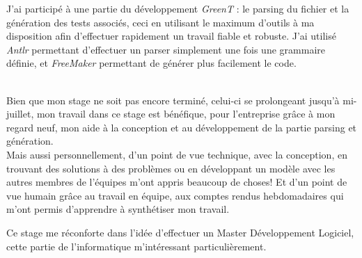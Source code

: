 \documentclass[a4paper, 12pt]{article}
\begin{document}
	J'ai participé à une partie du développement \textit{GreenT} : le parsing du fichier et la génération des tests associés, ceci en utilisant le maximum d'outils à ma
	disposition afin d'effectuer rapidement un travail fiable et robuste. J'ai utilisé \textit{Antlr} permettant d'effectuer un parser simplement une fois
	une grammaire définie, et \textit{FreeMaker} permettant de générer plus facilement le code.\\~

	Bien que mon stage ne soit pas encore terminé, celui-ci se prolongeant jusqu'à mi-juillet, mon travail dans ce stage est bénéfique, pour l'entreprise grâce à
	mon regard neuf, mon aide à la conception et au développement de la partie parsing et génération.\\
	Mais aussi personnellement, d'un point de vue technique, avec la conception, en trouvant des solutions à des problèmes ou en développant un modèle avec les autres membres de l'équipes m'ont appris beaucoup de
	choses! Et d'un point de vue humain grâce au travail en équipe, aux comptes rendus hebdomadaires qui m'ont permis d'apprendre à synthétiser mon travail.

	Ce stage me réconforte dans l'idée d'effectuer un Master Développement Logiciel, cette partie de l'informatique m'intéressant particulièrement.
\end{document}
